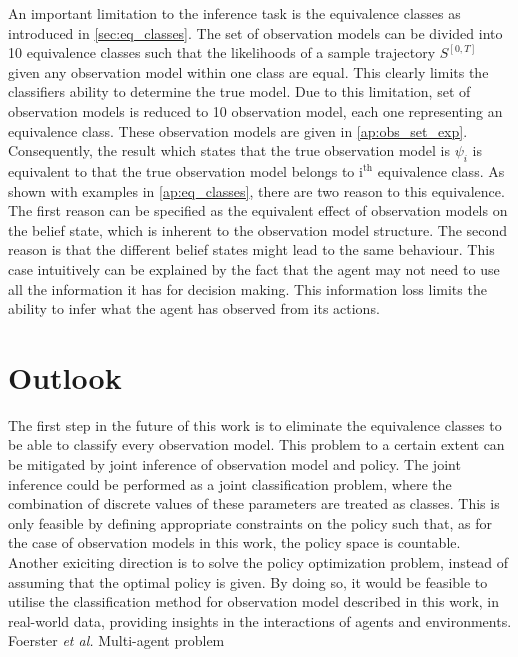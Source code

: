 An important limitation to the inference task is the equivalence classes as introduced in \cref{sec:eq_classes}. The set of observation models can be divided into 10 equivalence classes such that the likelihoods of a sample trajectory $ S^{[0,T]} $ given any observation model within one class are equal. This clearly limits the classifiers ability to determine the true model. Due to this limitation, set of observation models is reduced to 10 observation model, each one representing an equivalence class. These observation models are given in \cref{ap:obs_set_exp}. Consequently, the result which states that the true observation model is $ \psi_i $ is equivalent to that the true observation model belongs to $ \text{i}^{\text{th}} $ equivalence class. As shown with examples in \cref{ap:eq_classes}, there are two reason to this equivalence. The first reason can be specified as the equivalent effect of observation models on the belief state, which is inherent to the observation model structure. The second reason is that the different belief states might lead to the same behaviour. This case intuitively can be explained by the fact that the agent may not need to use all the information it has for decision making. This information loss limits the ability to infer what the agent has observed from its actions.\\

\chapter{Outlook}
\label{chap:6}
The first step in the future of this work is to eliminate the equivalence classes to be able to classify every observation model. This problem to a certain extent can be mitigated by joint inference of observation model and policy. The joint inference could be performed as a joint classification problem, where the combination of discrete values of these parameters are treated as classes. This is only feasible by defining appropriate constraints on the policy such that, as for the case of observation models in this work, the policy space is countable.\\ 
Another exiciting direction is to solve the policy optimization problem, instead of assuming that the optimal policy is given. By doing so, it would be feasible to utilise the classification method for observation model described in this work, in real-world data, providing insights in the interactions of agents and environments.\\
Foerster \textit{et al.} \cite{Foerster2016}
Multi-agent problem
